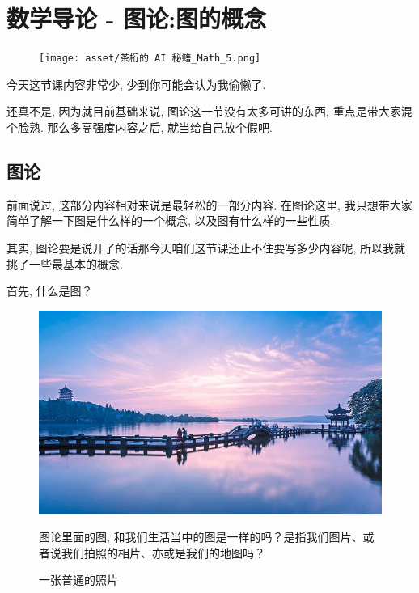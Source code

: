 \chapter{数学导论 - 图论:图的概念}

\begin{figure}[ht]
  \centering
  \texttt{[image: asset/茶桁的 AI 秘籍\_Math\_5.png]}
\end{figure}

\newpage

今天这节课内容非常少, 少到你可能会认为我偷懒了. 

还真不是, 因为就目前基础来说, 图论这一节没有太多可讲的东西, 重点是带大家混个脸熟. 那么多高强度内容之后, 就当给自己放个假吧. 

\section{图论}

前面说过, 这部分内容相对来说是最轻松的一部分内容. 在图论这里, 我只想带大家简单了解一下图是什么样的一个概念, 以及图有什么样的一些性质. 

其实, 图论要是说开了的话那今天咱们这节课还止不住要写多少内容呢, 所以我就挑了一些最基本的概念. 

首先, 什么是图？

\begin{figure}[ht]
  \centering
  \begin{minipage}[h]{0.4\textwidth}
    \includegraphics[width=\textwidth]{asset/03be564f-4ce8-45d1-acde-f8e0300c4e6f.png}
    \caption{一张普通的照片}
    \label{fig:img6_1}
  \end{minipage}%
  \hspace{3em}
  \begin{minipage}[h]{0.4\textwidth}
    图论里面的图, 和我们生活当中的图是一样的吗？是指我们图片、或者说我们拍照的相片、亦或是我们的地图吗？
  \end{minipage}
\end{figure}

